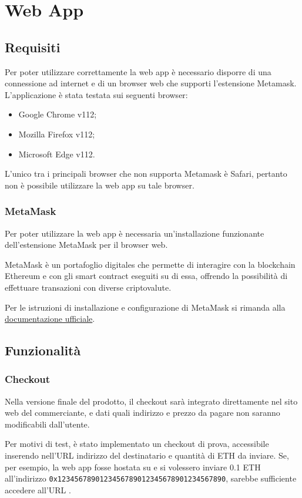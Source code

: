 \section{Web App}

\subsection{Requisiti}
Per poter utilizzare correttamente la web app è necessario disporre di una connessione ad internet e di un browser web che supporti l'estensione Metamask. L'applicazione è stata testata sui seguenti browser:
\begin{itemize}
    \item Google Chrome v112;
    \item Mozilla Firefox v112;
    \item Microsoft Edge v112.
\end{itemize}
L'unico tra i principali browser che non supporta Metamask è Safari, pertanto non è possibile utilizzare la web app su tale browser.

\subsubsection{MetaMask}
Per poter utilizzare la web app è necessaria un'installazione funzionante dell'estensione MetaMask per il browser web.

MetaMask è un portafoglio digitales che permette di interagire con la blockchain Ethereum e con gli smart contract eseguiti su di essa, offrendo la possibilità di effettuare transazioni con diverse criptovalute.

Per le istruzioni di installazione e configurazione di MetaMask si rimanda alla \href{https://support.metamask.io/hc/en-us/articles/360015489531-Getting-started-with-MetaMask}{documentazione ufficiale}.

\subsection{Funzionalità}

\subsubsection{Checkout}
Nella versione finale del prodotto, il checkout sarà integrato direttamente nel sito web del commerciante, e dati quali indirizzo e prezzo da pagare non saranno modificabili dall'utente.

Per motivi di test, è stato implementato un checkout di prova, accessibile inserendo nell'URL indirizzo del destinatario e quantità di ETH da inviare. Se, per esempio, la web app fosse hostata su  e si volessero inviare 0.1 ETH all'indirizzo \texttt{0x1234567890123456789012345678901234567890}, sarebbe sufficiente accedere all'URL .

